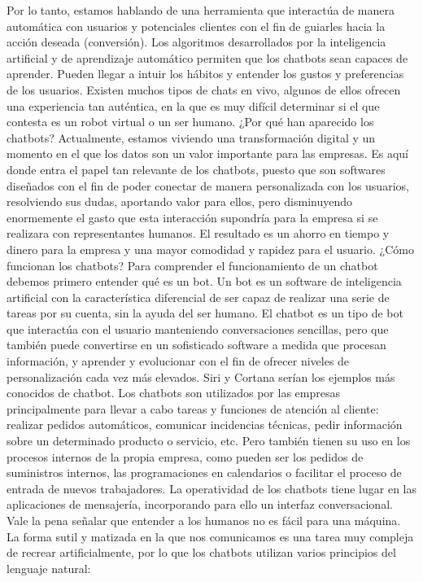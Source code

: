 Por lo tanto, estamos hablando de una herramienta que interactúa de manera automática con usuarios y potenciales clientes con el fin de guiarles hacia la acción deseada (conversión).
Los algoritmos desarrollados por la inteligencia artificial y de aprendizaje automático permiten que los chatbots sean capaces de aprender. Pueden llegar a intuir los hábitos y entender los gustos y preferencias de los usuarios.
Existen muchos tipos de chats en vivo, algunos de ellos ofrecen una experiencia tan auténtica, en la que es muy difícil determinar si el que contesta es un robot virtual o un ser humano.
¿Por qué han aparecido los chatbots?
Actualmente, estamos viviendo una transformación digital y un momento en el que los datos son un valor importante para las empresas. Es aquí donde entra el papel tan relevante de los chatbots, puesto que son softwares diseñados con el fin de poder conectar de manera personalizada con los usuarios, resolviendo sus dudas, aportando valor para ellos, pero disminuyendo enormemente el gasto que esta interacción supondría para la empresa si se realizara con representantes humanos. El resultado es un ahorro en tiempo y dinero para la empresa y una mayor comodidad y rapidez para el usuario.
¿Cómo funcionan los chatbots?
Para comprender el funcionamiento de un chatbot debemos primero entender qué es un bot. Un bot es un software de inteligencia artificial con la característica diferencial de ser capaz de realizar una serie de tareas por su cuenta, sin la ayuda del ser humano. 
El chatbot es un tipo de bot que interactúa con el usuario manteniendo conversaciones sencillas, pero que también puede convertirse en un sofisticado software a medida que procesan información, y aprender y evolucionar con el fin de ofrecer niveles de personalización cada vez más elevados. Siri y Cortana serían los ejemplos más conocidos de chatbot.
Los chatbots son utilizados por las empresas principalmente para llevar a cabo tareas y funciones de atención al cliente: realizar pedidos automáticos, comunicar incidencias técnicas, pedir información sobre un determinado producto o servicio, etc. Pero también tienen su uso en los procesos internos de la propia empresa, como pueden ser los pedidos de suministros internos, las programaciones en calendarios o facilitar el proceso de entrada de nuevos trabajadores.
La operatividad de los chatbots tiene lugar en las aplicaciones de mensajería, incorporando para ello un interfaz conversacional.
Vale la pena señalar que entender a los humanos no es fácil para una máquina. La forma sutil y matizada en la que nos comunicamos es una tarea muy compleja de recrear artificialmente, por lo que los chatbots utilizan varios principios del lenguaje natural:
